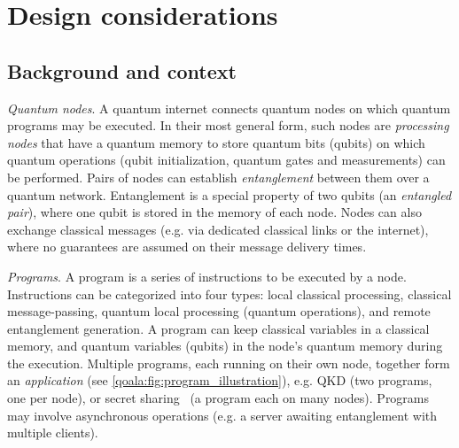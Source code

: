\section{Design considerations}
\label{qoala:sec:design_considerations}

\subsection{Background and context}
\label{qoala:sec:background_context}


\textit{Quantum nodes}.
A quantum internet connects quantum nodes on which quantum programs may be 
executed.
In their most general form, such nodes
are \textit{processing nodes} that have a quantum memory to store quantum bits (qubits) on which quantum operations (qubit initialization, quantum gates and measurements) can be performed. Pairs of nodes can establish \textit{entanglement} between them over a quantum network. Entanglement is a special property of two qubits (an \emph{entangled pair}), where one qubit is stored in the memory of each node. Nodes can also exchange classical messages (e.g. via dedicated classical links or the internet), where no guarantees are assumed on their message delivery times. 

\textit{Programs}.
A program is a series of instructions to be executed by a node.
Instructions can be categorized into four types: local classical processing, classical message-passing, quantum local processing (quantum operations), and remote entanglement generation.
A program can keep classical variables in a classical memory, and quantum variables (qubits) in the node's quantum memory during the execution.
Multiple programs, each running on their own node, together form an \textit{application} (see \cref{qoala:fig:program_illustration}), e.g. QKD (two programs, one per node),
or secret sharing~\cite{hillery1999quantum} (a program each on many nodes).
Programs may involve asynchronous operations (e.g. a server awaiting entanglement with multiple clients).

